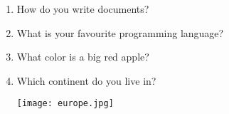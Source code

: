 \documentclass[12pt,onside,a4paper,article]{memoir}
\begin{document}
\begin{enumerate}

\item{How do you write documents?}
\begin{flushright}
\end{flushright}
\item{What is your favourite programming language?}
\begin{flushright}
\end{flushright}
\item{What color is a big red apple?}
\begin{flushright}
\end{flushright}
\item{Which continent do you live in?}
\begin{flushright}
\end{flushright}
\begin{flushleft}
\texttt{[image: europe.jpg]}
\end{flushleft}
\end{enumerate}

\vspace*{4.5cm}
\begin{flushright}
 \end{flushright}
\end{document}

